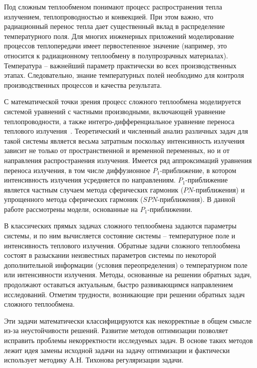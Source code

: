     {\actuality}
    Под сложным теплообменом понимают
    процесс распространения тепла излучением, теплопроводностью и
    конвекцией.
    При этом важно, что радиационный перенос тепла дает
    существенный вклад в распределение температурного поля.
    Для многих инженерных приложений моделирование процессов теплопередачи имеет
    первостепенное значение (например, это относится к радиационному
    теплообмену в полупрозрачных материалах).
    Температура – важнейший параметр практически во всех производственных этапах.
    Следовательно, знание температурных полей необходимо для контроля производственных
    процессов и качества результата.

    С математической точки зрения процесс сложного теплообмена
    моделируется системой уравнений с частными производными, включающей
    уравнение теплопроводности, а также интегро-дифференциальное уравнение
    переноса теплового излучения~\cite{Ozisik1976, Sparrow1971, howell2010thermal, modest2013radiative}.
    Теоретический и численный анализ различных задач для такой системы является весьма
    затратным поскольку интенсивность излучения зависит не только от
    пространственной и временной переменных, но и от направления
    распространения излучения.
    Имеется ряд аппроксимаций уравнения переноса излучения, в том числе диффузионное
    $P_1$-приближение, в котором интенсивность излучения усредняется по направлениям.
    $P_1$-приближение является частным случаем метода сферических гармоник ($PN$-приближения)
    и упрощенного метода сферических гармоник ($SPN$-приближения).
    В данной работе рассмотрены модели, основанные на $P_1$-приближении.


    В классических прямых задачах сложного теплообмена задаются
    параметры системы, и по ним вычисляется состояние системы –
    температурное поле и интенсивность теплового излучения.
    Обратные задачи сложного теплообмена состоят в разыскании неизвестных параметров
    системы по некоторой дополнительной информации (условия переопределения)
    о температурном поле или интенсивности излучения.
    Методы, основанные на решении обратных задач, продолжают оставаться
    актуальным, быстро развивающимся направлением исследований.
    Отметим трудности, возникающие при решении обратных задач сложного
    теплообмена.


    Эти задачи математически классифицируются как некорректные в общем
    смысле из-за неустойчивости решений. Развитие методов оптимизации
    позволяет исправить проблемы некорректности исследуемых задач. В основе
    таких методов лежит идея замены исходной задачи на задачу оптимизации и
    фактически использует методику А.Н. Тихонова регуляризации задачи.

